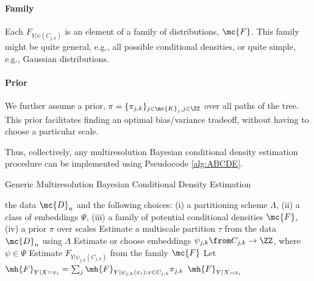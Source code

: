 \paragraph{Family} Each $F_{Y | \psi(C_{j,k})}$ is an element of a family of distributions, $\mc{F}$.  This family might be quite general, e.g., all possible conditional densities, or quite simple, e.g., Gaussian distributions.

\paragraph{Prior} We further assume a prior, $\pi=\{\pi_{j,k}\}_{j \in \mc{K}_j, j \in \ZZ}$ over all paths of the tree. This prior facilitates finding an optimal bias/variance tradeoff, without having to choose a particular scale.

Thus, collectively, any multiresolution Bayesian conditional density estimation procedure can be implemented using Pseudocode \ref{alg:ABCDE}.

\begin{algorithm}
	\caption{Generic Multiresolution Bayesian Conditional Density Estimation} \label{alg:ABCDE}
\begin{algorithmic}[1]
	\REQUIRE the data $\mc{D}_n$ and the following choices: (i) a partitioning scheme $\Lambda$, (ii) a class of embeddings $\Psi$, (iii) a family of potential conditional densities $\mc{F}$, (iv) a prior $\pi$ over scales
	\STATE Estimate a multiscale partition $\tau$ from the data $\mc{D}_n$ using $\Lambda$
	\STATE Estimate or choose embeddings $\psi_{j,k} \from C_{j,k} \to \ZZ$, where $\psi \in \Psi$ 
	\STATE Estimate $F_{Y|\psi_{j,k}(C_{j,k})}$ from the family $\mc{F}$
	\STATE Let $\mh{F}_{Y|X=x_i} = \sum_j \mh{F}_{Y | \psi_{j,k}(x_i) : x \in C_{j,k}}  \pi_{j,k}$ 
	\ENSURE $\mh{F}_{Y|X=x_i}$
\end{algorithmic}
\end{algorithm}



